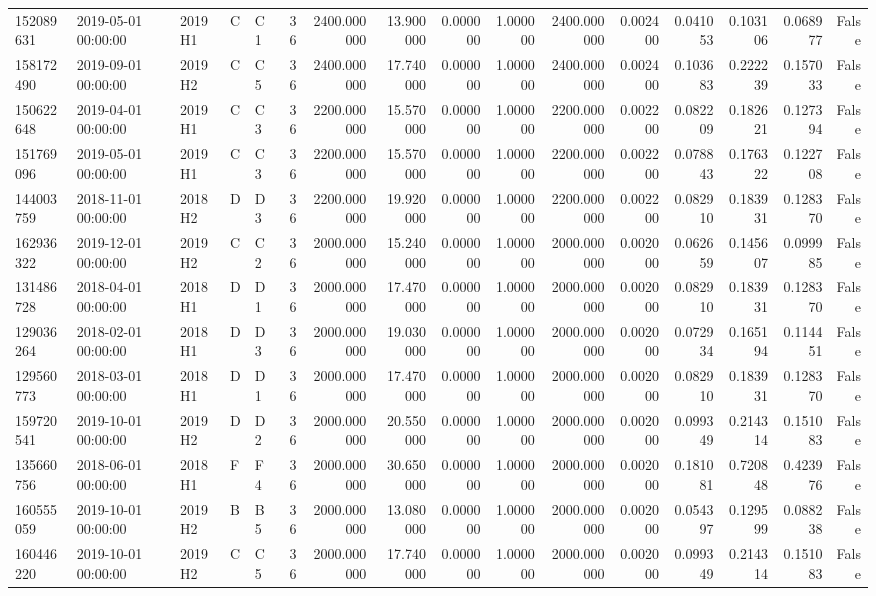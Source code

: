 \begin{tabular}{lllllrrrrrrrrrrr}
152089631 & 2019-05-01 00:00:00 & 2019H1 & C & C1 & 36 & 2400.000000 & 13.900000 & 0.000000 & 1.000000 & 2400.000000 & 0.002400 & 0.041053 & 0.103106 & 0.068977 & False \\
158172490 & 2019-09-01 00:00:00 & 2019H2 & C & C5 & 36 & 2400.000000 & 17.740000 & 0.000000 & 1.000000 & 2400.000000 & 0.002400 & 0.103683 & 0.222239 & 0.157033 & False \\
150622648 & 2019-04-01 00:00:00 & 2019H1 & C & C3 & 36 & 2200.000000 & 15.570000 & 0.000000 & 1.000000 & 2200.000000 & 0.002200 & 0.082209 & 0.182621 & 0.127394 & False \\
151769096 & 2019-05-01 00:00:00 & 2019H1 & C & C3 & 36 & 2200.000000 & 15.570000 & 0.000000 & 1.000000 & 2200.000000 & 0.002200 & 0.078843 & 0.176322 & 0.122708 & False \\
144003759 & 2018-11-01 00:00:00 & 2018H2 & D & D3 & 36 & 2200.000000 & 19.920000 & 0.000000 & 1.000000 & 2200.000000 & 0.002200 & 0.082910 & 0.183931 & 0.128370 & False \\
162936322 & 2019-12-01 00:00:00 & 2019H2 & C & C2 & 36 & 2000.000000 & 15.240000 & 0.000000 & 1.000000 & 2000.000000 & 0.002000 & 0.062659 & 0.145607 & 0.099985 & False \\
131486728 & 2018-04-01 00:00:00 & 2018H1 & D & D1 & 36 & 2000.000000 & 17.470000 & 0.000000 & 1.000000 & 2000.000000 & 0.002000 & 0.082910 & 0.183931 & 0.128370 & False \\
129036264 & 2018-02-01 00:00:00 & 2018H1 & D & D3 & 36 & 2000.000000 & 19.030000 & 0.000000 & 1.000000 & 2000.000000 & 0.002000 & 0.072934 & 0.165194 & 0.114451 & False \\
129560773 & 2018-03-01 00:00:00 & 2018H1 & D & D1 & 36 & 2000.000000 & 17.470000 & 0.000000 & 1.000000 & 2000.000000 & 0.002000 & 0.082910 & 0.183931 & 0.128370 & False \\
159720541 & 2019-10-01 00:00:00 & 2019H2 & D & D2 & 36 & 2000.000000 & 20.550000 & 0.000000 & 1.000000 & 2000.000000 & 0.002000 & 0.099349 & 0.214314 & 0.151083 & False \\
135660756 & 2018-06-01 00:00:00 & 2018H1 & F & F4 & 36 & 2000.000000 & 30.650000 & 0.000000 & 1.000000 & 2000.000000 & 0.002000 & 0.181081 & 0.720848 & 0.423976 & False \\
160555059 & 2019-10-01 00:00:00 & 2019H2 & B & B5 & 36 & 2000.000000 & 13.080000 & 0.000000 & 1.000000 & 2000.000000 & 0.002000 & 0.054397 & 0.129599 & 0.088238 & False \\
160446220 & 2019-10-01 00:00:00 & 2019H2 & C & C5 & 36 & 2000.000000 & 17.740000 & 0.000000 & 1.000000 & 2000.000000 & 0.002000 & 0.099349 & 0.214314 & 0.151083 & False \\

\end{tabular}
